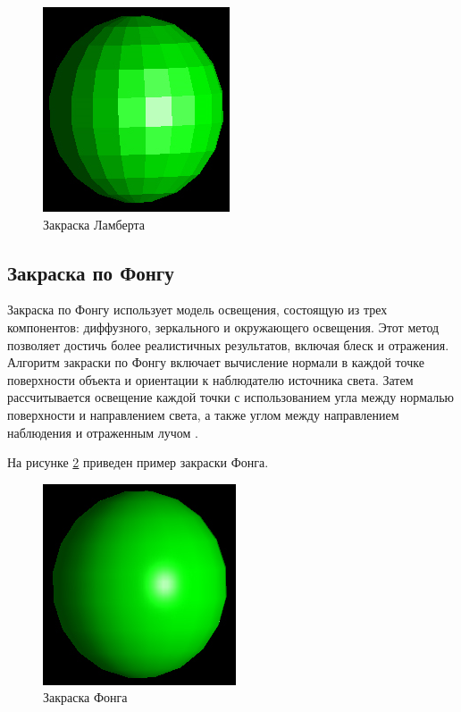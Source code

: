\begin{figure}[H]
	\begin{center}
		\includegraphics[scale=1.5]{img/flatshade.png}
	\end{center}
	\captionsetup{justification=centering}
	\caption{Закраска Ламберта}
	\label{img:fs}
\end{figure}

\subsection{Закраска по Фонгу}
Закраска по Фонгу использует модель освещения, состоящую из трех 
компонентов: диффузного, зеркального и окружающего освещения. Этот метод 
позволяет достичь более реалистичных результатов, включая блеск и 
отражения. Алгоритм закраски по Фонгу включает вычисление нормали в 
каждой точке поверхности объекта и ориентации к наблюдателю источника 
света. Затем рассчитывается освещение каждой точки с использованием угла 
между нормалью поверхности и направлением света, а также углом между 
направлением наблюдения и отраженным лучом \cite{CG}.

На рисунке \ref{img:ps} приведен пример закраски Фонга.

\begin{figure}[H]
	\begin{center}
		\includegraphics[scale=1.5]{img/phongshade.png}
	\end{center}
	\captionsetup{justification=centering}
	\caption{Закраска Фонга}
	\label{img:ps}
\end{figure}

